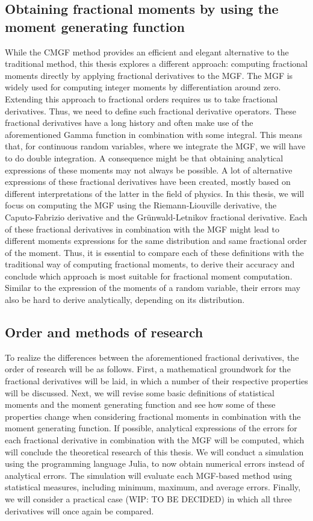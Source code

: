 \subsection{Obtaining fractional moments by using the moment generating function}
While the CMGF method provides an efficient  and elegant alternative to the traditional method, this thesis explores a different approach: computing fractional moments directly by applying fractional derivatives to the MGF. The MGF is widely used for computing integer moments by differentiation around zero. Extending this approach to fractional orders requires us to take fractional derivatives. Thus, we need to define such fractional derivative operators. These fractional derivatives have a long history and often make use of the aforementioned Gamma function in combination with some integral. This means that, for continuous random variables, where we integrate the MGF, we will have to do double integration. A consequence might be that obtaining analytical expressions of these moments may not always be possible. A lot of alternative expressions of these fractional derivatives have been created, mostly based on different interpretations of the latter in the field of physics. In this thesis, we will focus on computing the MGF using the Riemann-Liouville derivative, the Caputo-Fabrizio derivative and the Grünwald-Letnikov fractional derivative. Each of these fractional derivatives in combination with the MGF might lead to different moments expressions for the same distribution and same fractional order of the moment. Thus, it is essential to compare each of these definitions with the traditional way of computing fractional moments, to derive their accuracy and conclude which approach is most suitable for fractional moment computation. Similar to the expression of the moments of a random variable, their errors may also be hard to derive analytically, depending on its distribution.

\subsection{Order and methods of research}
To realize the differences between the aforementioned fractional derivatives, the order of research will be as follows. First, a mathematical groundwork for the fractional derivatives will be laid, in which a number of their respective properties will be discussed. Next, we will revise some basic definitions of statistical moments and the moment generating function and see how some of these properties change when considering fractional moments in combination with the moment generating function. If possible, analytical expressions of the errors for each fractional derivative in combination with the MGF will be computed, which will conclude the theoretical research of this thesis. We will conduct a simulation using the programming language Julia, to now obtain numerical errors instead of analytical errors. The simulation will evaluate each MGF-based method using statistical measures, including minimum, maximum, and average errors. Finally, we will consider a practical case (WIP: TO BE DECIDED) in which all three derivatives will once again be compared.
